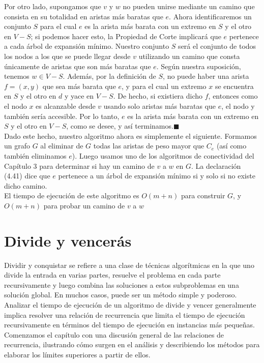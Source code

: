 \documentclass[a4paper]{article}
\begin{document}
Por otro lado, supongamos que $v$ y $w$ no pueden unirse mediante un camino que consista en su totalidad en aristas más baratas que $e$. Ahora identificaremos un conjunto $S$ para el cual $e$ es la arista más barata con un extremo en $S$ y el otro en $V-S$; si podemos hacer esto, la Propiedad de Corte implicará que $e$ pertenece a cada árbol de expansión mínimo. Nuestro conjunto $S$ será el conjunto de todos los nodos a los que se puede llegar desde $v$ utilizando un camino que consta únicamente de aristas que son más baratas que $e$. Según nuestra suposición, tenemos $w \in V-S$. Además, por la definición de $S$, no puede haber una arista $f=(x,y)$ que sea más barata que $e$, y para el cual un extremo $x$ se encuentra en $S$ y el otro en $d$ y yace en $V-S$. De hecho, si existiera dicho $f$, entonces como el nodo $x$ es alcanzable desde $v$ usando solo aristas más baratas que $e$, el nodo y también sería accesible. Por lo tanto, $e$ es la arista más barata con un extremo en $S$ y el otro en $V-S$, como se desee, y así terminamos.$\blacksquare$\\

Dado este hecho, nuestro algoritmo ahora es simplemente el siguiente. Formamos un grafo $G$ al eliminar de $G$ todas las aristas de peso mayor que $C_e$ (así como también eliminamos $e$). Luego usamos uno de los algoritmos de conectividad del Capítulo 3 para determinar si hay un camino de $v$ a $w$ en $G$. La declaración (4.41) dice que $e$ pertenece a un árbol de expansión mínimo si y solo si no existe dicho camino.\\

El tiempo de ejecución de este algoritmo es $O(m+n)$ para construir $G$, y $O(m+n)$ para probar un camino de $v$ a $w$\\


\section{Divide y vencerás}

Dividir y conquistar se refiere a una clase de técnicas algorítmicas en la que uno divide la entrada en varias partes, resuelve el problema en cada parte recursivamente y luego combina las soluciones a estos subproblemas en una solución global. En muchos casos, puede ser un método simple y poderoso.\\

Analizar el tiempo de ejecución de un algoritmo de divide y vencer generalmente implica resolver una relación de recurrencia que limita el tiempo de ejecución recursivamente en términos del tiempo de ejecución en instancias más pequeñas. Comenzamos el capítulo con una discusión general de las relaciones de recurrencia, ilustrando cómo surgen en el análisis y describiendo los métodos para elaborar los límites superiores a partir de ellos.\\
\end{document}
